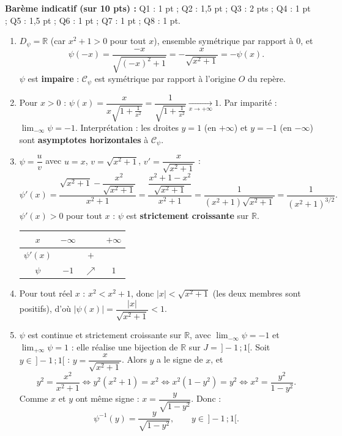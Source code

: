 \documentclass[11pt]{article}
\begin{document}
\begin{corrige}
\textbf{Barème indicatif (sur 10 pts) :} Q1 : 1 pt ; Q2 : 1,5 pt ; Q3 : 2 pts ; Q4 : 1 pt ; Q5 : 1,5 pt ; Q6 : 1 pt ; Q7 : 1 pt ; Q8 : 1 pt.

\begin{enumerate}
\item $D_\psi=\mathbb{R}$ (car $x^2+1>0$ pour tout $x$), ensemble symétrique par rapport à $0$, et
\[ \psi(-x)=\frac{-x}{\sqrt{(-x)^2+1}}=-\frac{x}{\sqrt{x^2+1}}=-\psi(x). \]
$\psi$ est \textbf{impaire} : $\mathcal{C}_\psi$ est symétrique par rapport à l'origine $O$ du repère.

\item Pour $x>0$ : $\psi(x)=\dfrac{x}{x\sqrt{1+\frac{1}{x^2}}}=\dfrac{1}{\sqrt{1+\frac{1}{x^2}}}\xrightarrow[x\to+\infty]{}1$.
Par imparité : $\lim_{-\infty}\psi=-1$.
Interprétation : les droites $y=1$ (en $+\infty$) et $y=-1$ (en $-\infty$) sont \textbf{asymptotes horizontales} à $\mathcal{C}_\psi$.

\item $\psi=\dfrac{u}{v}$ avec $u=x$, $v=\sqrt{x^2+1}$, $v'=\dfrac{x}{\sqrt{x^2+1}}$ :
\[ \psi'(x)=\frac{\sqrt{x^2+1}-\dfrac{x^2}{\sqrt{x^2+1}}}{x^2+1}=\frac{\dfrac{x^2+1-x^2}{\sqrt{x^2+1}}}{x^2+1}=\frac{1}{(x^2+1)\sqrt{x^2+1}}=\frac{1}{(x^2+1)^{3/2}}. \]
$\psi'(x)>0$ pour tout $x$ : $\psi$ est \textbf{strictement croissante} sur $\mathbb{R}$.
\begin{center}
\begin{tabular}{|c|ccc|}\hline
$x$ & $-\infty$ & & $+\infty$ \\ \hline
$\psi'(x)$ & & $+$ & \\ \hline
$\psi$ & $-1$ & $\nearrow$ & $1$ \\ \hline
\end{tabular}
\end{center}

\item Pour tout réel $x$ : $x^2<x^2+1$, donc $|x|<\sqrt{x^2+1}$ (les deux membres sont positifs), d'où $|\psi(x)|=\dfrac{|x|}{\sqrt{x^2+1}}<1$.

\item $\psi$ est continue et strictement croissante sur $\mathbb{R}$, avec $\lim_{-\infty}\psi=-1$ et $\lim_{+\infty}\psi=1$ : elle réalise une bijection de $\mathbb{R}$ sur $J=\,]-1\,;1[$.
Soit $y\in\,]-1\,;1[$ : $y=\dfrac{x}{\sqrt{x^2+1}}$. Alors $y$ a le signe de $x$, et
\[ y^2=\frac{x^2}{x^2+1}\iff y^2(x^2+1)=x^2\iff x^2(1-y^2)=y^2\iff x^2=\frac{y^2}{1-y^2}. \]
Comme $x$ et $y$ ont même signe : $x=\dfrac{y}{\sqrt{1-y^2}}$. Donc :
\[ \psi^{-1}(y)=\frac{y}{\sqrt{1-y^2}},\qquad y\in\,]-1\,;1[. \]


\end{enumerate}
\end{corrige}
\end{document}
